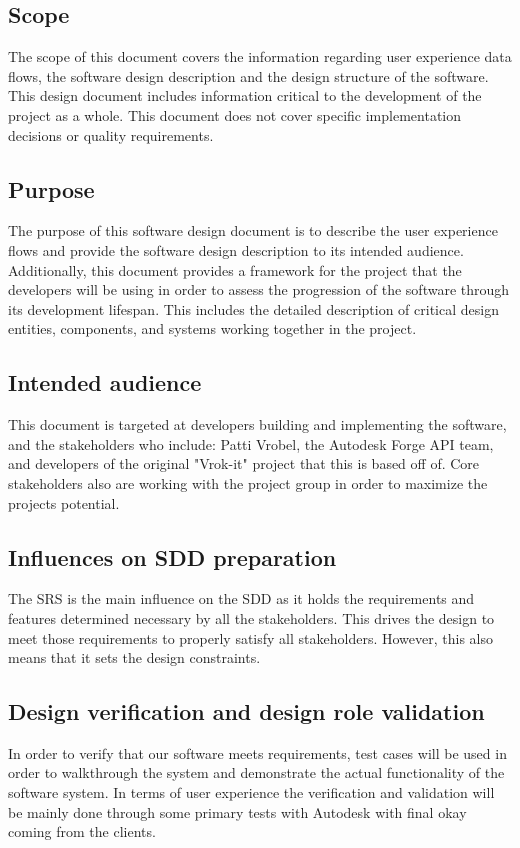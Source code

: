 \documentclass[letterpaper, 10pt, draftclsnofoot, compsoc, onecolumn]{IEEEtran}
\begin{document}
\subsection{Scope}
The scope of this document covers the information regarding user experience data flows, the software design description and the design structure of the software. This design document includes information critical to the development of the project as a whole. This document does not cover specific implementation decisions or quality requirements.
\subsection{Purpose}
The purpose of this software design document is to describe the user experience flows and provide the software design description to its intended audience. Additionally, this document provides a framework for the project that the developers will be using in order to assess the progression of the software through its development lifespan. This includes the detailed description of critical design entities, components, and systems working together in the project.
\subsection{Intended audience}
This document is targeted at developers building and implementing the software, and the stakeholders who include: Patti Vrobel, the Autodesk Forge API team,  and developers of the original "Vrok-it" project that this is based off of. Core stakeholders also are working with the project group in order to maximize the projects potential.

\subsection{Influences on SDD preparation}
The SRS is the main influence on the SDD as it holds the requirements and features determined necessary by all the stakeholders. This drives the design to meet those requirements to properly satisfy all stakeholders. However, this also means that it sets the design constraints.

\subsection{Design verification and design role validation}
In order to verify that our software meets requirements, test cases will be used in order to walkthrough the system and demonstrate the actual functionality of the software system. In terms of user experience the verification and validation will be mainly done through some primary tests with Autodesk with final okay coming from the clients.
\end{document}

